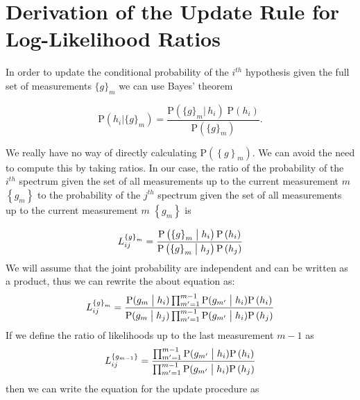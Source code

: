 \chapter{Derivation of the Update Rule for Log-Likelihood Ratios}\label{app:Derivation of the LLR Update}

In order to update the conditional probability of the $i^{th}$ hypothesis given the full set of measurements $\{ g \}_m$ we can use Bayes' theorem

\begin{equation}
\mbox{P} \left( h_i | \{ g \}_m \right) = \frac{\mbox{P} \left( \{g\}_m |\, h_i \right) \; \mbox{P} \left(h_i\right)}{\mbox{P} \left( \{g\}_m \right)}.
\end{equation}


We really have no way of directly calculating $\mbox{P}\left( \left\{g\right\}_m \right)$. We can avoid the need to compute this by taking ratios. In our case, the ratio of the probability of the $i^{th}$ spectrum given the set of all measurements up to the current measurement $m$ $\left\{g_{m}\right\}$ to the probability of the $j^{th}$ spectrum given the set of all measurements up to the current measurement $m$ $\left\{g_{m}\right\}$ is

\begin{equation}
    L_{ij}^{\left\{ g \right\}_m}
    =
    \frac
    {
    \mbox{P}\left(\left\{ g \right\}_m\bigm\vert {h}_i\right)\mbox{P}\left({h}_i\right)
    }
    {
    \mbox{P}\left(\left\{ g \right\}_m\bigm\vert {h}_j\right)\mbox{P}\left({h}_j\right)
    }
\end{equation}
%
We will assume that the joint probability are independent and can be written as a product, thus we can rewrite the about equation as:
%
\begin{equation}
L_{ij}^{\left\{ g \right\}_m} =
{
    \mbox{P}( g_m \bigm\vert {h}_i ) \prod_{m'=1}^{m-1} \mbox{P}(g_{m'} \bigm\vert {h}_i ) \mbox{P}\left({h}_i\right)
\over
    \mbox{P}( g_m \bigm\vert {h}_j ) \prod_{m'=1}^{m-1} \mbox{P}(g_{m'} \bigm\vert {h}_i ) \mbox{P} \left({h}_j\right)
}
\end{equation}
%
If we define the ratio of likelihoods up to the last measurement $m-1$ as
%
\begin{equation}
    L_{ij}^{\left\{ g_{m-1} \right\}} =
    {
        \prod_{m'=1}^{m-1} \mbox{P}(g_{m'} \bigm\vert {h}_i ) \mbox{P}\left({h}_i\right)
    \over
        \prod_{m'=1}^{m-1} \mbox{P}(g_{m'} \bigm\vert {h}_i ) \mbox{P}\left({h}_j\right)
    }
\end{equation}
%
then we can write the equation for the update procedure as

